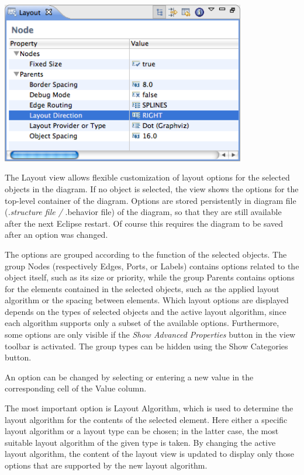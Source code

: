 \includegraphics[width=0.8\textwidth]{images/043-LayoutView.png}

The Layout view allows flexible customization of layout options for the selected objects in the \eTrice{} 
diagram. If no object is selected, the view shows the options for the top-level container of the diagram. 
Options are stored persistently in diagram file (\emph{.structure file / }.behavior file) of the \eTrice{} 
diagram, so that they are still available after the next Eclipse restart. Of course this requires the 
diagram to be saved after an option was changed.

The options are grouped according to the function of the selected objects. The group Nodes (respectively 
Edges, Ports, or Labels) contains options related to the object itself, such as its size or priority, 
while the group Parents contains options for the elements contained in the selected objects, such as the 
applied layout algorithm or the spacing between elements. Which layout options are displayed depends on 
the types of selected objects and the active layout algorithm, since each algorithm supports only a subset 
of the available options. Furthermore, some options are only visible if the \textit{Show Advanced 
Properties} button in the view toolbar is activated. The group types can be hidden using the Show 
Categories button.

An option can be changed by selecting or entering a new value in the corresponding cell of the Value column.

The most important option is Layout Algorithm, which is used to determine the layout algorithm for the 
contents of the selected element. Here either a specific layout algorithm or a layout type can be chosen; 
in the latter case, the most suitable layout algorithm of the given type is taken. By changing the active 
layout algorithm, the content of the layout view is updated to display only those options that are 
supported by the new layout algorithm.

